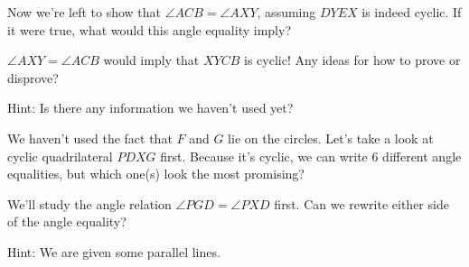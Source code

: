 

Now we're left to show that $\angle ACB = \angle AXY$, assuming $DYEX$ is indeed cyclic. If it were true, what would this angle equality imply?



$\angle AXY = \angle ACB$ would imply that $XYCB$ is cyclic! Any ideas for how to prove or disprove?

Hint: Is there any information we haven't used yet?


We haven't used the fact that $F$ and $G$ lie on the circles. Let's take a look at cyclic quadrilateral $PDXG$ first. Because it's cyclic, we can write 6 different angle equalities, but which one(s) look the most promising?


We'll study the angle relation $\angle PGD = \angle PXD$ first. Can we rewrite either side of the angle equality?

Hint: We are given some parallel lines.







